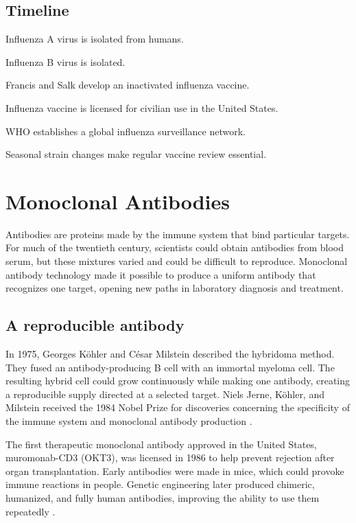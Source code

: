 \documentclass[12pt,oneside]{book}
\begin{document}
\section*{Timeline}
\begin{description}[leftmargin=2.3cm,style=nextline]
  \item[1933] Influenza A virus is isolated from humans.
  \item[1936] Influenza B virus is isolated.
  \item[1940s] Francis and Salk develop an inactivated influenza vaccine.
  \item[1945] Influenza vaccine is licensed for civilian use in the United States.
  \item[1952] WHO establishes a global influenza surveillance network.
  \item[1947 onward] Seasonal strain changes make regular vaccine review essential.
\end{description}
\chapter[Monoclonal Antibodies]{Monoclonal Antibodies}

Antibodies are proteins made by the immune system that bind particular
targets. For much of the twentieth century, scientists could obtain antibodies
from blood serum, but these mixtures varied and could be difficult to
reproduce. Monoclonal antibody technology made it possible to produce a
uniform antibody that recognizes one target, opening new paths in laboratory
diagnosis and treatment.

\section{A reproducible antibody}
In 1975, Georges Köhler and César Milstein described the hybridoma method. They fused an antibody-producing B cell with an immortal myeloma cell. The resulting hybrid cell could grow continuously while making one antibody, creating a reproducible supply directed at a selected target. Niels Jerne, Köhler, and Milstein received the 1984 Nobel Prize for discoveries concerning the specificity of the immune system and monoclonal antibody production \cite{nobelMonoclonal}.

The first therapeutic monoclonal antibody approved in the United States,
muromonab-CD3 (OKT3), was licensed in 1986 to help prevent rejection after
organ transplantation. Early antibodies were made in mice, which could provoke
immune reactions in people. Genetic engineering later produced chimeric,
humanized, and fully human antibodies, improving the ability to use them
repeatedly \cite{monoclonalHistory}.
\end{document}
